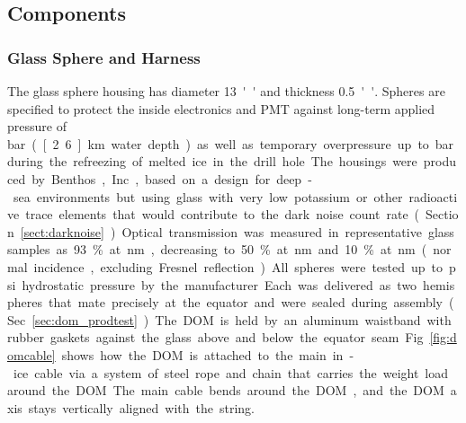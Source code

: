 \subsection{\label{sec:dom_components} Components}

\subsubsection{\label{sec:sphere}Glass Sphere and Harness}

The glass sphere housing has diameter \SI{13}{''} and thickness \SI{0.5}{''}.
Spheres are specified to protect the inside electronics and PMT against long-term applied pressure of 
\unit[250]bar (\unit[2.6]km water depth)
as well as temporary overpressure up to \unit[690]bar during the refreezing of melted ice in the drill hole.
The housings were produced by Benthos, Inc., based on a design for deep-sea environments but using glass
with very low potassium or other radioactive trace elements that would contribute to the dark noise
count rate (Section~\ref{sect:darknoise}).  
Optical transmission was measured in representative glass samples as 93\% at \unit[400]nm,
decreasing to 50\% at \unit[340]nm and 10\% at \unit[315]nm (normal incidence, excluding Fresnel reflection).


All spheres were tested up to \unit[10,000]psi hydrostatic pressure by the manufacturer.
Each was delivered as two hemispheres that mate precisely at the equator
and were sealed during assembly (Sec.~\ref{sec:dom_prodtest}).  The DOM
is held by an aluminum waistband with rubber gaskets against 
the glass above and below the equator seam. 
Fig.~\ref{fig:domcable} shows how the DOM is attached to the main in-ice cable via a system
of steel rope and chain that carries the weight load around the DOM.
The main cable bends around the DOM, and the DOM axis stays vertically aligned with the string.

